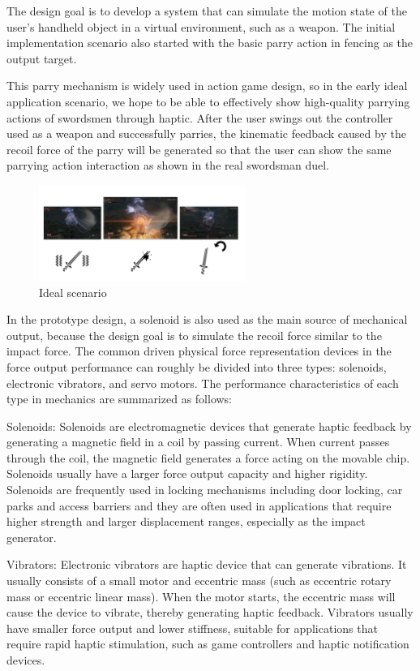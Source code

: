 The design goal is to develop a system that can simulate the motion state of the user's handheld object in a virtual environment, such as a weapon. The initial implementation scenario also started with the basic parry action in fencing as the output target. 

This parry mechanism is widely used in action game design, so in the early ideal application scenario, we hope to be able to effectively show high-quality parrying actions of swordsmen through haptic. After the user swings out the controller used as a weapon and successfully parries, the kinematic feedback caused by the recoil force of the parry will be generated so that the user can show the same parrying action interaction as shown in the real swordsman duel.

\begin{figure}[h]
\centering
\includegraphics[width=0.6\textwidth]{A_thesis/figures/032.png}
\caption{Ideal scenario}
\end{figure}

In the prototype design, a solenoid is also used as the main source of mechanical output, because the design goal is to simulate the recoil force similar to the impact force. The common driven physical force representation devices in the force output performance can roughly be divided into three types: solenoids, electronic vibrators, and servo motors. The performance characteristics of each type in mechanics are summarized as follows:

Solenoids: Solenoids are electromagnetic devices that generate haptic feedback by generating a magnetic field in a coil by passing current. When current passes through the coil, the magnetic field generates a force acting on the movable chip. Solenoids usually have a larger force output capacity and higher rigidity. Solenoids are frequently used in locking mechanisms including door locking, car parks and access barriers and they are often used in applications that require higher strength and larger displacement ranges, especially as the impact generator.

Vibrators: Electronic vibrators are haptic device that can generate vibrations. It usually consists of a small motor and eccentric mass (such as eccentric rotary mass or eccentric linear mass). When the motor starts, the eccentric mass will cause the device to vibrate, thereby generating haptic feedback. Vibrators usually have smaller force output and lower stiffness, suitable for applications that require rapid haptic stimulation, such as game controllers and haptic notification devices.

